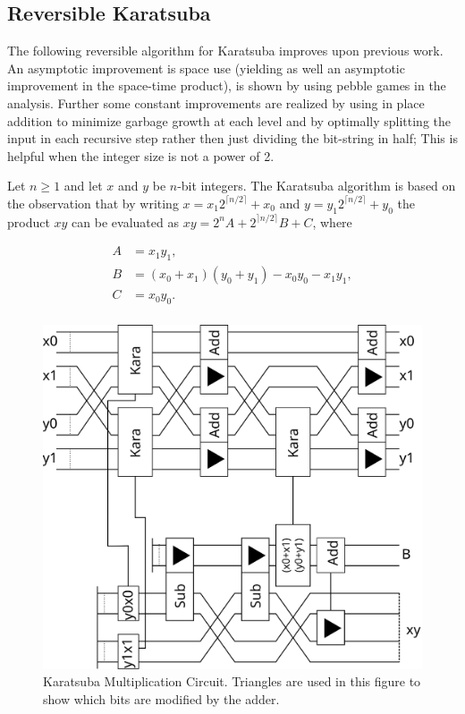   \subsection{Reversible Karatsuba\label{sec:kara}}

    The following reversible algorithm for Karatsuba improves upon previous
    work\cite{PF:2006}. An asymptotic improvement is space use (yielding as
    well an asymptotic improvement in the space-time product), is shown by
    using pebble games in the analysis. Further some constant improvements are
    realized by using in place addition to minimize garbage growth at each
    level and by optimally splitting the input in each recursive step rather
    then just dividing the bit-string in half; This is helpful when the integer
    size is not a power of 2. 

    Let $n\geq 1$ and let $x$ and $y$ be $n$-bit integers.  The
    Karatsuba\cite{KO:1963} algorithm is based on the observation that by
    writing $x=x_1 2^{\lceil n/2\rceil}+x_0$ and $y=y_1 2^{\lceil n/2\rceil
    }+y_0$ the product $xy$ can be evaluated as $xy=2^n A + 2^{\rceil n/2
    \rceil} B + C$, where

    \begin{align*}
      A &= x_1 y_1, \\
      B &= (x_0+x_1)(y_0+y_1) - x_0 y_0 - x_1 y_1,\\
      C &= x_0 y_0. \\
    \end{align*}
    \begin{figure}[ht]
      \capstart
      \centering
      \includegraphics[width=2\textwidth/3]{images/karatsuba2}
      \caption{Karatsuba Multiplication Circuit. Triangles are used in this figure to show which bits are modified by the adder.}
      \label{fig:kara2}
     \end{figure}

